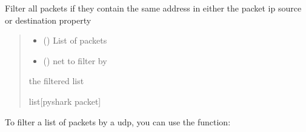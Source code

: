 \documentclass[letterpaper,10pt,english,openany,oneside]{sphinxmanual}
\begin{document}
\begin{fulllineitems}
\label{\detokenize{index:pktsniffer.filter_by_tcp}}
\pysigstartsignatures
\pysiglinewithargsret
{}
{}
{}
\pysigstopsignatures
\sphinxAtStartPar
Filter all packets if they contain the same address in
either the packet ip source or destination property
\begin{quote}\begin{description}
\begin{itemize}
\item {} 
\sphinxAtStartPar
{} (\sphinxstyleliteralemphasis{\sphinxupquote{{[}}}\sphinxstyleliteralemphasis{\sphinxupquote{{]}}}) \textendash{} List of packets

\item {} 
\sphinxAtStartPar
{} () \textendash{} net to filter by

\end{itemize}

\sphinxAtStartPar
the filtered list

\sphinxAtStartPar
list{[}pyshark packet{]}

\end{description}\end{quote}

\end{fulllineitems}


\sphinxAtStartPar
To filter a list of packets by a udp, you can
use the  function:
\end{document}
